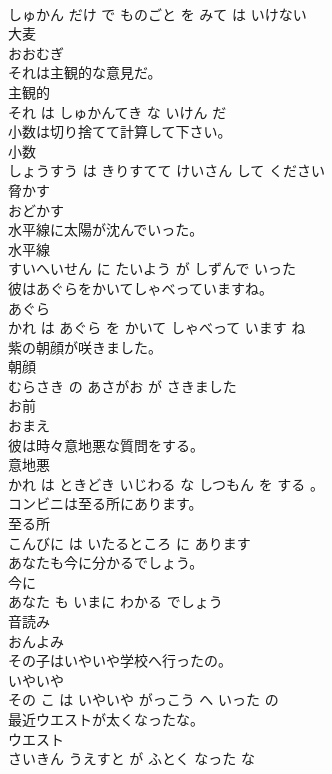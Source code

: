 \documentclass[8pt]{extreport}
\begin{document}
\begin{CJK}{UTF8}{min}
\\	しゅかん だけ で ものごと を みて は いけない			
\\	大麦	
\\	おおむぎ			
\\	それは主観的な意見だ。	
\\	主観的 
\\	それ は しゅかんてき な いけん だ			
\\	小数は切り捨てて計算して下さい。	
\\	小数 
\\	しょうすう は きりすてて けいさん して ください			
\\	脅かす	
\\	おどかす			
\\	水平線に太陽が沈んでいった。	
\\	水平線 
\\	すいへいせん に たいよう が しずんで いった			
\\	彼はあぐらをかいてしゃべっていますね。	
\\	あぐら 
\\	かれ は あぐら を かいて しゃべって います ね			
\\	紫の朝顔が咲きました。	
\\	朝顔 
\\	むらさき の あさがお が さきました			
\\	お前	
\\	おまえ			
\\	彼は時々意地悪な質問をする。	
\\	意地悪 
\\	かれ は ときどき いじわる な しつもん を する 。			
\\	コンビニは至る所にあります。	
\\	至る所 
\\	こんびに は いたるところ に あります			
\\	あなたも今に分かるでしょう。	
\\	今に 
\\	あなた も いまに わかる でしょう			
\\	音読み	
\\	おんよみ			
\\	その子はいやいや学校へ行ったの。	
\\	いやいや 
\\	その こ は いやいや がっこう へ いった の			
\\	最近ウエストが太くなったな。	
\\	ウエスト 
\\	さいきん うえすと が ふとく なった な			

\end{CJK}
\end{document}
